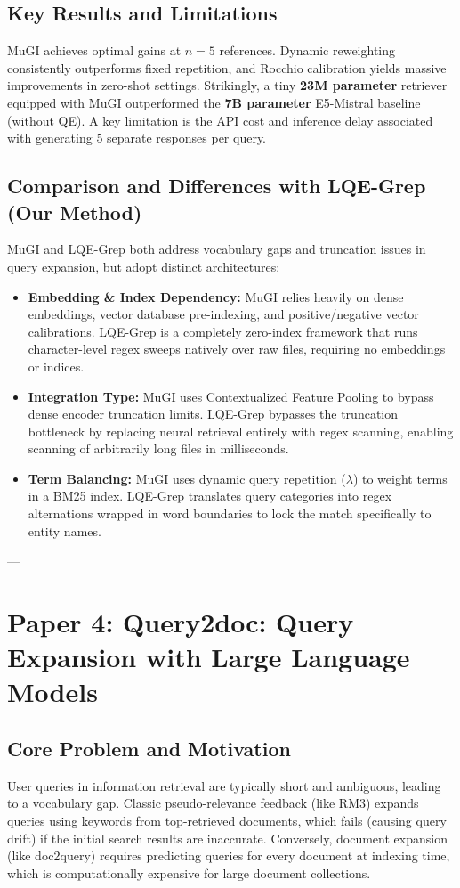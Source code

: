 \documentclass[11pt,a4paper]{article}
\begin{document}
\subsection{Key Results and Limitations}
MuGI achieves optimal gains at $n=5$ references. Dynamic reweighting consistently outperforms fixed repetition, and Rocchio calibration yields massive improvements in zero-shot settings. Strikingly, a tiny \textbf{23M parameter} retriever equipped with MuGI outperformed the \textbf{7B parameter} E5-Mistral baseline (without QE). A key limitation is the API cost and inference delay associated with generating 5 separate responses per query.

\subsection{Comparison and Differences with LQE-Grep (Our Method)}
MuGI and LQE-Grep both address vocabulary gaps and truncation issues in query expansion, but adopt distinct architectures:
\begin{itemize}
    \item \textbf{Embedding & Index Dependency:} MuGI relies heavily on dense embeddings, vector database pre-indexing, and positive/negative vector calibrations. LQE-Grep is a completely zero-index framework that runs character-level regex sweeps natively over raw files, requiring no embeddings or indices.
    \item \textbf{Integration Type:} MuGI uses Contextualized Feature Pooling to bypass dense encoder truncation limits. LQE-Grep bypasses the truncation bottleneck by replacing neural retrieval entirely with regex scanning, enabling scanning of arbitrarily long files in milliseconds.
    \item \textbf{Term Balancing:} MuGI uses dynamic query repetition ($\lambda$) to weight terms in a BM25 index. LQE-Grep translates query categories into regex alternations wrapped in word boundaries to lock the match specifically to entity names.
\end{itemize}

---

\section{Paper 4: Query2doc: Query Expansion with Large Language Models}
\label{sec:paper4}

\subsection{Core Problem and Motivation}
User queries in information retrieval are typically short and ambiguous, leading to a vocabulary gap. Classic pseudo-relevance feedback (like RM3) expands queries using keywords from top-retrieved documents, which fails (causing query drift) if the initial search results are inaccurate. Conversely, document expansion (like doc2query) requires predicting queries for every document at indexing time, which is computationally expensive for large document collections.
\end{document}
